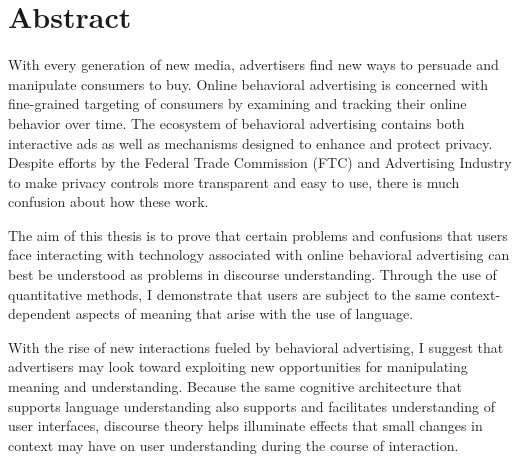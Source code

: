 
\begingroup
\let\clearpage\relax
\let\cleardoublepage\relax
\let\cleardoublepage\relax

\chapter*{Abstract}
With every generation of new media, advertisers find new ways to persuade and manipulate consumers to buy. Online behavioral advertising is concerned with fine-grained targeting of consumers by examining and tracking their online behavior over time. The ecosystem of behavioral advertising contains both interactive ads as well as mechanisms designed to enhance and protect privacy. Despite efforts by the Federal Trade Commission (FTC) and Advertising Industry to make privacy controls more transparent and easy to use, there is much confusion about how these work. 

The aim of this thesis is to prove that certain problems and confusions that users face interacting with technology associated with online behavioral advertising can best be understood as problems in discourse understanding. Through the use of quantitative methods, I demonstrate that users are subject to the same context-dependent aspects of meaning that arise with the use of language. 

With the rise of new interactions fueled by behavioral advertising, I suggest that advertisers may look toward exploiting new opportunities for manipulating meaning and understanding. Because the same cognitive architecture that supports language understanding also supports and facilitates understanding of user interfaces, discourse theory helps illuminate effects that small changes in context may have on user understanding during the course of interaction.


\vfill
\endgroup			
\vfill
